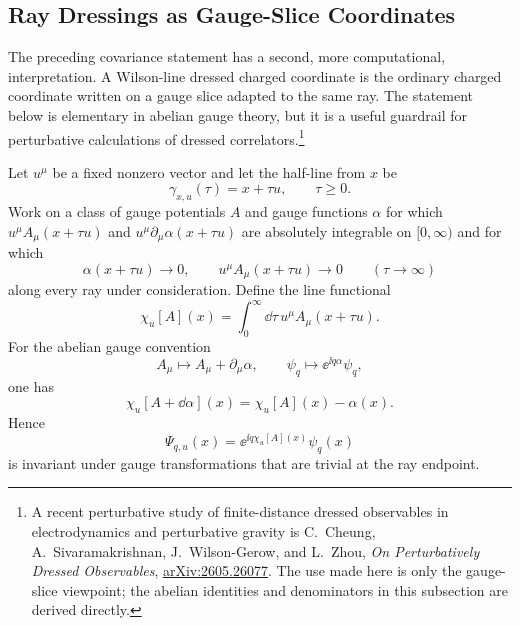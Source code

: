 \subsection{Ray Dressings as Gauge-Slice Coordinates}

The preceding covariance statement has a second, more computational,
interpretation.  A Wilson-line dressed charged coordinate is the ordinary
charged coordinate written on a gauge slice adapted to the same ray.  The
statement below is elementary in abelian gauge theory, but it is a useful
guardrail for perturbative calculations of dressed correlators.\footnote{A
recent perturbative study of finite-distance dressed observables in
electrodynamics and perturbative gravity is C.~Cheung,
A.~Sivaramakrishnan, J.~Wilson-Gerow, and L.~Zhou, \emph{On Perturbatively
Dressed Observables}, \href{https://arxiv.org/abs/2605.26077}
{arXiv:2605.26077}.  The use made here is only the gauge-slice viewpoint; the
abelian identities and denominators in this subsection are derived directly.}

Let \(u^\mu\) be a fixed nonzero vector and let the half-line from \(x\) be
\[
  \gamma_{x,u}(\tau)=x+\tau u,\qquad \tau\ge0 .
\]
Work on a class of gauge potentials \(A\) and gauge functions \(\alpha\) for
which \(u^\mu A_\mu(x+\tau u)\) and
\(u^\mu\partial_\mu\alpha(x+\tau u)\) are absolutely integrable on
\([0,\infty)\) and for which
\[
  \alpha(x+\tau u)\longrightarrow0,
  \qquad
  u^\mu A_\mu(x+\tau u)\longrightarrow0
  \qquad(\tau\to\infty)
\]
along every ray under consideration.  Define the line functional
\begin{equation}
  \chi_u[A](x)
  =
  \int_0^\infty \dd\tau\,u^\mu A_\mu(x+\tau u).
  \label{eq:ray-dressing-line-functional}
\end{equation}
For the abelian gauge convention
\[
  A_\mu\longmapsto A_\mu+\partial_\mu\alpha,
  \qquad
  \psi_q\longmapsto \ee^{\ii q\alpha}\psi_q ,
\]
one has
\[
  \chi_u[A+\dd\alpha](x)
  =
  \chi_u[A](x)-\alpha(x).
\]
Hence
\begin{equation}
  \Psi_{q,u}(x)
  =
  \ee^{\ii q\chi_u[A](x)}\psi_q(x)
  \label{eq:ray-dressed-charged-coordinate}
\end{equation}
is invariant under gauge transformations that are trivial at the ray endpoint.


